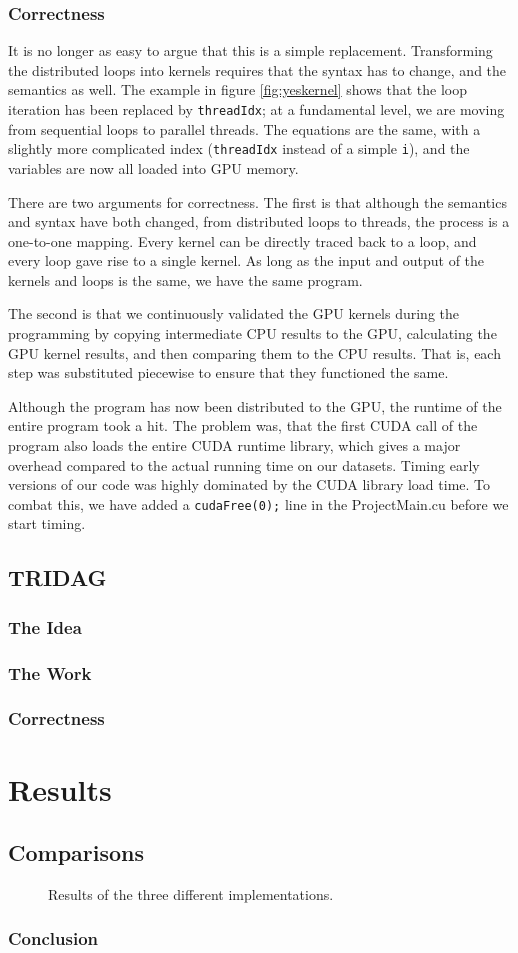 \documentclass[]{report}
\begin{document}
\subsubsection{Correctness}
It is no longer as easy to argue that this is a simple replacement. Transforming the distributed loops into kernels requires that the syntax has to change, and the semantics as well. The example in figure \ref{fig:yeskernel} shows that the loop iteration has been replaced by \texttt{threadIdx}; at a fundamental level, we are moving from sequential loops to parallel threads. The equations are the same, with a slightly more complicated index (\texttt{threadIdx} instead of a simple \texttt{i}), and the variables are now all loaded into GPU memory.

There are two arguments for correctness. The first is that although the semantics and syntax have both changed, from distributed loops to threads, the process is a one-to-one mapping. Every kernel can be directly traced back to a loop, and every loop gave rise to a single kernel. As long as the input and output of the kernels and loops is the same, we have the same program.

The second is that we continuously validated the GPU kernels during the programming by copying intermediate CPU results to the GPU, calculating the GPU kernel results, and then comparing them to the CPU results. That is, each step was substituted piecewise to ensure that they functioned the same.

Although the program has now been distributed to the GPU, the runtime of the entire program took a hit. The problem was, that the first CUDA call of the program also loads the entire CUDA runtime library, which gives a major overhead compared to the actual running time on our datasets. Timing early versions of our code was highly dominated by the CUDA library load time. To combat this, we have added a \texttt{cudaFree(0);} line in the ProjectMain.cu before we start timing.
\subsection{TRIDAG}
\subsubsection{The Idea}
\subsubsection{The Work}
\subsubsection{Correctness}

\section{Results}
\subsection{Comparisons}
\begin{figure}[h]
\caption{\label{fig:results} Results of the three different implementations.}
\end{figure}
\subsubsection{Conclusion}
\end{document}
